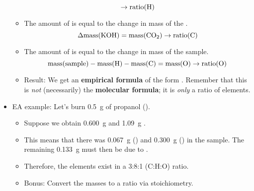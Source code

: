 \documentclass[../notes.tex]{subfiles}
\begin{document}
\begin{itemize}
\begin{itemize}
\begin{equation*}
            \to \text{ratio}(\ce{H})
        \end{equation*}
        \item The amount of  is equal to the change in mass of the .
        \begin{equation*}
            \Delta\text{mass}(\ce{KOH}) = \text{mass}(\ce{CO2})
            \to \text{ratio}(\ce{C})
        \end{equation*}
        \item The amount of  is equal to the change in mass of the sample.
        \begin{equation*}
            \text{mass}(\text{sample})-\text{mass}(\ce{H})-\text{mass}(\ce{C}) = \text{mass}(\ce{O})
             \to \text{ratio}(\ce{O})
        \end{equation*}
        \item Result: We get an \textbf{empirical formula} of the form . Remember that this is \emph{not} (necessarily) the \textbf{molecular formula}; it is \emph{only} a ratio of elements.
    \end{itemize}
    \item EA example: Let's burn \SI{0.5}{\gram} of propanol ().
    \begin{itemize}
        \item Suppose we obtain \SI{0.600}{\gram}  and \SI{1.09}{\gram} .
        \item This means that there was \SI{0.067}{\gram} () and \SI{0.300}{\gram} () in the sample. The remaining \SI{0.133}{\gram} must then be due to .
        \item Therefore, the elements exist in a 3:8:1 (C:H:O) ratio.
        \item Bonus: Convert the masses to a ratio via stoichiometry.
\end{itemize}
\end{itemize}
\end{document}
